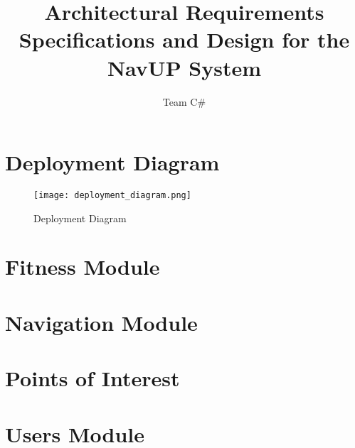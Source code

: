 \documentclass[11pt]{article}
\author{Team C\#}
\title{Architectural Requirements Specifications and Design for the NavUP System}
\begin{document}
	\setlength{\parskip}{6pt}
	
	
	
	\tableofcontents
	
	\newpage
	
\section{Deployment Diagram}
\begin{figure}[H]
	\centering
	\texttt{[image: deployment\_diagram.png]}
	\caption{Deployment Diagram}
	\label{fig:deployment_diagram}
\end{figure}

\section{Fitness Module}
    
    
\section{Navigation Module}
    

\section{Points of Interest}
    
    
\section{Users Module}
    
\end{document}
